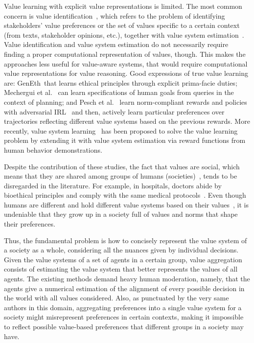 \documentclass{ecai}
\begin{document}
Value learning with explicit value representations is limited. The most common concern is value identification~\cite{wilson2018valueidentificationtext,Liscio2021Axies,understandingValuesSocialMedia}, which refers to the problem of identifying stakeholders' value preferences or the set of values specific to a certain context (from texts, stakeholder opinions, etc.), together with value system estimation~\cite{Serramia2018,liscio-etal-2022-cross,Liscio2023InferringHybridValues}. Value identification and value system estimation do not necessarily require finding a proper computational representation of values, though. This makes the approaches less useful for value-aware systems, that would require computational value representations for value reasoning. Good expressions of true value learning are: GenEth~\cite{Anderson2018GenEthILP}that learns ethical principles through explicit prima-facie duties; Mechergui et al.~\cite{Mechergui2023goalAlignment} can learn specifications of human goals from queries in the context of planning; and Pesch et al.~\cite{Peschl2022LearnPreferencesFromExperts} learn norm-compliant rewards and policies with adversarial IRL~\cite{AIRLFu2018} and then, actively learn particular preferences over trajectories reflecting different value systems based on the previous rewards. More recently, value system learning~\cite{andres2024vecompPaper} has been proposed to solve the value learning problem by extending it with value system estimation via reward functions from human behavior demonstrations. 

Despite the contribution of these studies, the fact that values are social, which means that they are shared among groups of humans (societies)~\cite{Osman2024}, tends to be disregarded in the literature. For example, in hospitals, doctors abide by bioethical principles and comply with the same medical protocols~\cite{towardsAwarenessMedicalField2024}. Even though humans are different and hold different value systems based on their  values~\cite{Serramia2018}, it is undeniable that they grow up in a society full of values and norms that shape their preferences. 

Thus, the fundamental problem is how to concisely represent the value system of a society as a whole, considering all the nuances given by individual decisions. Given the value systems of a set of agents in a certain group, value aggregation~\cite{leraleri2024aggregation,leraleri2024aggregation,eaa24AaronTOPSISValueAggregation} consists of estimating the value system that better represents the values of all agents. The existing methods demand heavy human moderation, namely, that the agents give a numerical estimation of the alignment of every possible decision in the world with all values considered. Also, as punctuated by the very same authors in this domain, aggregating preferences into a single value system for a society might misrepresent preferences in certain contexts, making it impossible to reflect possible value-based preferences that different groups in a society may have.
\end{document}
